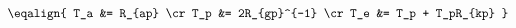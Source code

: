 \hsize 0pt
\vsize 0pt
\nopagenumbers
\overfullrule 0pt
\noindent
$$
\eqalign {
T_a &= R_{ap} \cr
T_p &= 2R_{gp}^{-1} \cr
T_e &= T_p + T_pR_{kp}
}
$$
\bye